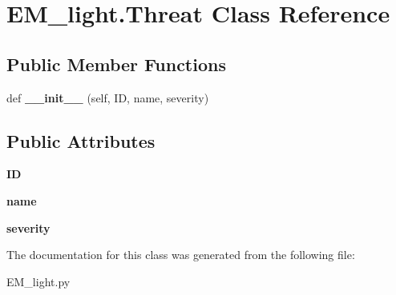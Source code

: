 \hypertarget{classEM__light_1_1Threat}{}\section{E\+M\+\_\+light.\+Threat Class Reference}
\label{classEM__light_1_1Threat}
\subsection*{Public Member Functions}
\begin{DoxyCompactItemize}
\item 
def {\bfseries \+\_\+\+\_\+init\+\_\+\+\_\+} (self, ID, name, severity)\hypertarget{classEM__light_1_1Threat_a863328a0fa468ffa60c63d9b03499b90}{}\label{classEM__light_1_1Threat_a863328a0fa468ffa60c63d9b03499b90}

\end{DoxyCompactItemize}
\subsection*{Public Attributes}
\begin{DoxyCompactItemize}
\item 
{\bfseries ID}\hypertarget{classEM__light_1_1Threat_ab31244ad398d29499d637c53aeeb1a13}{}\label{classEM__light_1_1Threat_ab31244ad398d29499d637c53aeeb1a13}

\item 
{\bfseries name}\hypertarget{classEM__light_1_1Threat_a01d501be213e125f12c6ddc5fa111d64}{}\label{classEM__light_1_1Threat_a01d501be213e125f12c6ddc5fa111d64}

\item 
{\bfseries severity}\hypertarget{classEM__light_1_1Threat_a891876e2ec276452dc1ca4dedd91f80a}{}\label{classEM__light_1_1Threat_a891876e2ec276452dc1ca4dedd91f80a}

\end{DoxyCompactItemize}


The documentation for this class was generated from the following file\+:\begin{DoxyCompactItemize}
\item 
E\+M\+\_\+light.\+py\end{DoxyCompactItemize}
